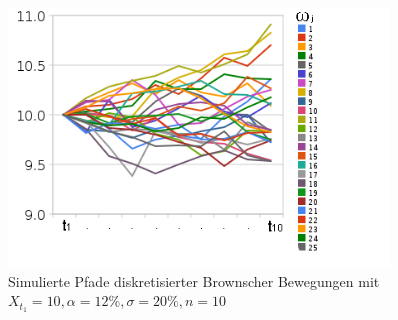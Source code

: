 \documentclass[12pt,a4paper,headsepline,bibliography=totoc,listof=totoc,headinclude=false,footinclude=false,BCOR5mm]{scrreprt} %
\begin{document}
\begin{figure}[h!]
    \centering
\includegraphics[width=0.90\textwidth]{2}\caption{Simulierte Pfade diskretisierter Brownscher Bewegungen mit \\ $X_{t_1}=10, \alpha=12\%, \sigma=20\%, n=10$}\label{pic2}
\end{figure}
\end{document}
